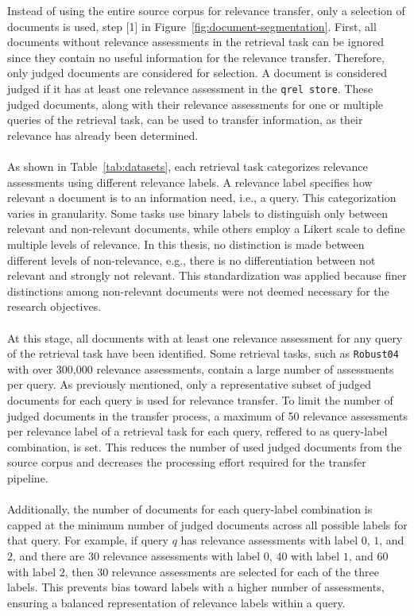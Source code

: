 Instead of using the entire source corpus for relevance transfer, only a selection of documents is used, step [1] in Figure~\ref{fig:document-segmentation}. First, all documents without relevance assessments in the retrieval task can be ignored since they contain no useful information for the relevance transfer. Therefore, only judged documents are considered for selection. A document is considered judged if it has at least one relevance assessment in the \texttt{qrel store}. These judged documents, along with their relevance assessments for one or multiple queries of the retrieval task, can be used to transfer information, as their relevance has already been determined.
\\\\
As shown in Table~\ref{tab:datasets}, each retrieval task categorizes relevance assessments using different relevance labels. A relevance label specifies how relevant a document is to an information need, i.e., a query. This categorization varies in granularity. Some tasks use binary labels to distinguish only between relevant and non-relevant documents, while others employ a Likert scale to define multiple levels of relevance. In this thesis, no distinction is made between different levels of non-relevance, e.g., there is no differentiation between \glqq not relevant\grqq{} and \glqq strongly not relevant\grqq{}. This standardization was applied because finer distinctions among non-relevant documents were not deemed necessary for the research objectives.
\\\\
At this stage, all documents with at least one relevance assessment for any query of the retrieval task have been identified. Some retrieval tasks, such as \texttt{Robust04} with over 300,000 relevance assessments, contain a large number of assessments per query. As previously mentioned, only a representative subset of judged documents for each query is used for relevance transfer. To limit the number of judged documents in the transfer process, a maximum of 50 relevance assessments per relevance label of a retrieval task for each query, reffered to as query-label combination, is set. This reduces the number of used judged documents from the source corpus and decreases the processing effort required for the transfer pipeline.
\\\\
Additionally, the number of documents for each query-label combination is capped at the minimum number of judged documents across all possible labels for that query. For example, if query $q$ has relevance assessments with label $0$, $1$, and $2$, and there are 30 relevance assessments with label $0$, 40 with label $1$, and 60 with label $2$, then 30 relevance assessments are selected for each of the three labels. This prevents bias toward labels with a higher number of assessments, ensuring a balanced representation of relevance labels within a query.

